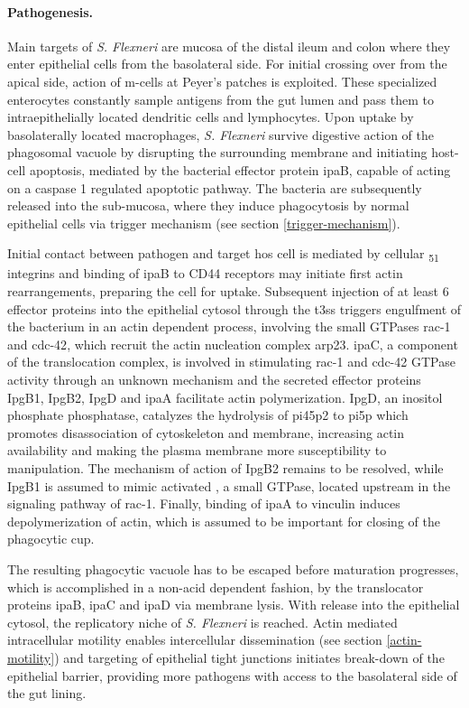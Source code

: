 \paragraph{Pathogenesis.}
Main targets of \textit{S. Flexneri} are mucosa of the distal ileum and colon where they enter epithelial cells from the basolateral side. For initial crossing over from the apical side, action of \gls{m-cells} at Peyer's patches is exploited. These specialized enterocytes constantly sample antigens from the gut lumen and pass them to intraepithelially located dendritic cells and lymphocytes. Upon uptake by basolaterally located macrophages, \textit{S. Flexneri} survive digestive action of the phagosomal vacuole by disrupting the surrounding membrane and initiating host-cell apoptosis, mediated by the bacterial effector protein \acrshort{ipa}B, capable of acting on a caspase 1 regulated apoptotic pathway. The bacteria are subsequently released into the sub-mucosa, where they induce phagocytosis by normal epithelial cells via trigger mechanism (see section \ref{trigger-mechanism}).

Initial contact between pathogen and target hos cell is mediated by cellular \textalpha\textsubscript{5}\textbeta\textsubscript{1} integrins and binding of \acrshort{ipa}B to CD44 receptors may initiate first actin rearrangements, preparing the cell for uptake. Subsequent injection of at least 6 effector proteins into the epithelial cytosol through the \gls{t3ss} triggers engulfment of the bacterium in an actin dependent process, involving the small GTPases \gls{rac-1} and \gls{cdc-42}, which recruit the actin nucleation complex \gls{arp23}. \Acrshort{ipa}C, a component of the translocation complex, is involved in stimulating \gls{rac-1} and \gls{cdc-42} GTPase activity through an unknown mechanism and the secreted effector proteins IpgB1, IpgB2, IpgD and \acrshort{ipa}A facilitate actin polymerization. IpgD, an inositol phosphate phosphatase, catalyzes the hydrolysis of \acrshort{pi45p2} to \acrshort{pi5p} which promotes disassociation of cytoskeleton and membrane, increasing actin availability and making the plasma membrane more susceptibility to manipulation. The mechanism of action of IpgB2 remains to be resolved, while IpgB1 is assumed to mimic activated , a small GTPase, located upstream in the signaling pathway of \gls{rac-1}. Finally, binding of \acrshort{ipa}A to vinculin induces depolymerization of actin, which is assumed to be important for closing of the phagocytic cup.

The resulting phagocytic vacuole has to be escaped before maturation progresses, which is accomplished in a non-acid dependent fashion, by the translocator proteins \acrshort{ipa}B, \acrshort{ipa}C and \acrshort{ipa}D via membrane lysis. With release into the epithelial cytosol, the replicatory niche of \textit{S. Flexneri} is reached. Actin mediated intracellular motility enables intercellular dissemination (see section \ref{actin-motility}) and targeting of epithelial tight junctions initiates break-down of the epithelial barrier, providing more pathogens with access to the basolateral side of the gut lining.

